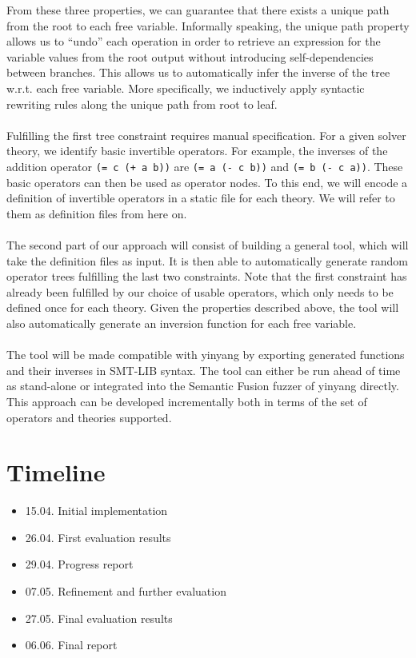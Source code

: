  \noindent From these three properties, we can guarantee that there exists a unique path from the root to each free variable. Informally speaking, the unique path property allows us to ``undo'' each operation in order to retrieve an expression for the variable values from the root output without introducing self-dependencies between branches. This allows us to automatically infer the inverse of the tree w.r.t. each free variable. More specifically, we inductively apply syntactic rewriting rules along the unique path from root to leaf. 
\\ \\
Fulfilling the first tree constraint requires manual specification. For a given solver theory, we identify basic invertible operators. For example, the inverses of the addition operator \lstinline{(= c (+ a b))} are \lstinline{(= a (- c b))} and \lstinline{(= b (- c a))}. These basic operators can then be used as operator nodes. To this end, we will encode a definition of invertible operators in a static file for each theory. We will refer to them as definition files from here on.
\\ \\
The second part of our approach will consist of building a general tool, which will take the definition files as input. It is then able to automatically generate random operator trees fulfilling the last two constraints. Note that the first constraint has already been fulfilled by our choice of usable operators, which only needs to be defined once for each theory. Given the properties described above, the tool will also automatically generate an inversion function for each free variable.
\\ \\
The tool will be made compatible with yinyang by exporting generated functions and their inverses in SMT-LIB syntax. The tool can either be run ahead of time as stand-alone or integrated into the Semantic Fusion fuzzer of yinyang directly. This approach can be developed incrementally both in terms of the set of operators and theories supported.

\section*{Timeline}

\begin{multicols}{2}
\begin{itemize}
    \item 15.04. Initial implementation
    \item 26.04. First evaluation results
    \item 29.04. Progress report
    \item 07.05. Refinement and further evaluation
    \item 27.05. Final evaluation results 
    \item 06.06. Final report
\end{itemize}
\end{multicols}